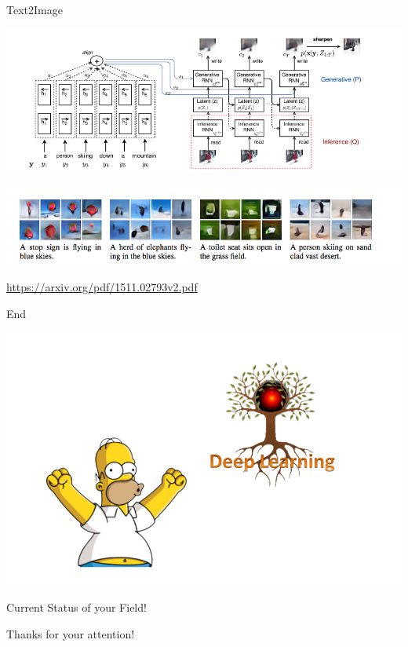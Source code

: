 \documentclass{beamer}
\begin{document}
\begin{frame}{Text2Image}
		\begin{center}
			\pause\includegraphics[scale=0.35]{img/t2i}
			
			\pause\includegraphics[scale=0.4]{img/t2ie.png}			
		\end{center}
	\pause\href{https://arxiv.org/pdf/1511.02793v2.pdf}{https://arxiv.org/pdf/1511.02793v2.pdf}
\end{frame}

\begin{frame}{End} 
	\begin{center}				
		\includegraphics[scale=0.35]{img/csf}
		
		{\huge Current Status of your Field!}
		
		Thanks for your attention!
	\end{center}
\end{frame}
\end{document}
